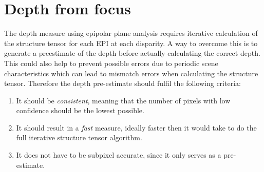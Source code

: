 \documentclass  [
  paper    = a4,
  BCOR     = 10mm,
  twoside,
  fontsize = 12pt,
  fleqn,
  toc      = bibnumbered,
  toc      = listofnumbered,
  numbers  = noendperiod,
  headings = normal,
  listof   = leveldown,
  version  = 3.03
]                                       {scrreprt}
\begin{document}
\section{Depth from focus}
\label{sec: depth from focus}
The depth measure using epipolar plane analysis requires iterative calculation of the structure tensor for each EPI at each disparity. A way to overcome this is to generate a preestimate of the depth before actually calculating the correct depth. This could also help to prevent possible errors due to periodic scene characteristics which can lead to mismatch errors when calculating the structure tensor. Therefore the depth pre-estimate should fulfil the following criteria:
\begin{enumerate}
	\item It should be \textit{consistent}, meaning that the number of pixels with low confidence should be the lowest possible.
	\item It should result in a \textit{fast} measure, ideally faster then it would take to do the full iterative structure tensor algorithm.
	\item It does not have to be subpixel accurate, since it only serves as a pre-estimate. 
\end{enumerate}
\end{document}
